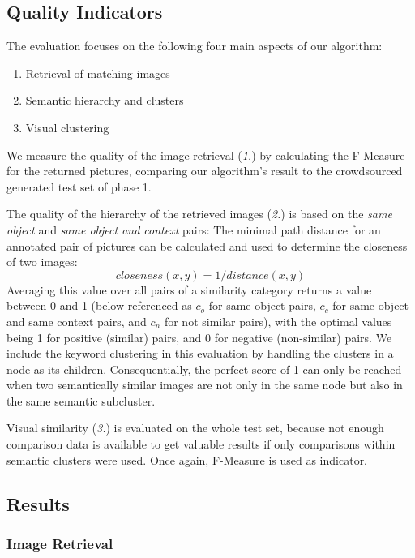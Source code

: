 \subsection{Quality Indicators}
The evaluation focuses on the following four main aspects of our algorithm:
\begin{enumerate}
\item Retrieval of matching images
\item Semantic hierarchy and clusters
\item Visual clustering
\end{enumerate}

We measure the quality of the image retrieval (\emph{1.}) by calculating the F-Measure for the returned pictures, comparing our algorithm's result to the crowdsourced generated test set of phase 1.  

The quality of the hierarchy of the retrieved images (\emph{2.}) is based on the \emph{same object} and \emph{same object and context} pairs: The  minimal path distance for an annotated pair of pictures can be calculated and used to determine the closeness of two images: \[closeness(x,y) = 1/distance(x,y)\] Averaging this value over all pairs of a similarity category returns a value between 0 and 1 (below referenced as $c_o$ for same object pairs, $c_c$ for same object and same context pairs, and $c_n$ for not similar pairs), with the optimal values being 1 for positive (similar) pairs, and 0 for negative (non-similar) pairs. 
We include the keyword clustering in this evaluation by handling the clusters in a node as its children. Consequentially, the perfect score of 1 can only be reached when two semantically similar images are not only in the same node but also in the same semantic subcluster.

Visual similarity (\emph{3.}) is evaluated on the whole test set, because not enough comparison data is available to get valuable results if only comparisons within semantic clusters were used. Once again, F-Measure is used as indicator.


\subsection{Results}
\label{sec_results}

\subsubsection*{Image Retrieval}

